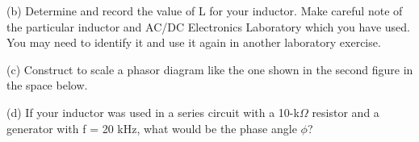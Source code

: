 (b) Determine and record the  value of L  for your inductor.
Make careful note of
the particular inductor and AC/DC Electronics Laboratory
which you have used. You may need to identify
it and use it again in another laboratory exercise.
\vspace{1.5in}

\newpage

(c) Construct to scale a phasor diagram like the one shown in the
second figure in the space below.
\vspace{3in}

(d) If your inductor was used in a series circuit with a 10-k\( \Omega  \)
resistor and a generator with f = 20 kHz, what would be the phase
angle \( \phi  \)?\vspace{20mm}

